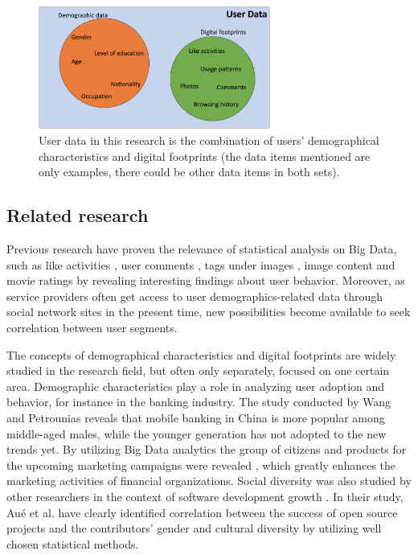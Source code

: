 \begin{figure}[h] 
  \begin{center}
    \includegraphics[width=3in]{Images/user_data_venn.png}
    \caption{User data in this research is the combination of users' demographical characteristics and digital footprints (the data items mentioned are only examples, there could be other data items in both sets).}
    \label{user_data_venn}
  \end{center}
\end{figure}

\subsection{Related research}
Previous research have proven the relevance of statistical analysis on Big Data, such as like activities \cite{jang2015noreciprocity, jang2016teensengagemorewithfewerphotos, ottoni2013ladies, guy2016whatsyourorganizationlike, jang2015no}, user comments \cite{jang2016teensengagemorewithfewerphotos}, tags under images \cite{jang2016teensengagemorewithfewerphotos}, image content \cite{hu2014we, bakhshi2014faces} and movie ratings \cite{saraee2004data, kabinsingha2012movie} by revealing interesting findings about user behavior. Moreover, as service providers often get access to user demographics-related data through social network sites in the present time, new possibilities become available to seek correlation between user segments. 

The concepts of demographical characteristics and digital footprints are widely studied in the research field, but often only separately, focused on one certain area. Demographic characteristics play a role in analyzing user adoption and behavior, for instance in the banking industry. The study conducted by Wang and Petrounias \cite{chinesemobilebankingusers} reveals that mobile banking in China is more popular among middle-aged males, while the younger generation has not adopted to the new trends yet. By utilizing Big Data analytics the group of citizens and products for the upcoming marketing campaigns were revealed \cite{chinesemobilebankingusers}, which greatly enhances the marketing activities of financial organizations. Social diversity was also studied by other researchers in the context of software development growth \cite{socialdiversityongithub}. In their study, Au\'e et al. \cite{socialdiversityongithub} have clearly identified correlation between the success of open source projects and the contributors' gender and cultural diversity by utilizing well chosen statistical methods. 


